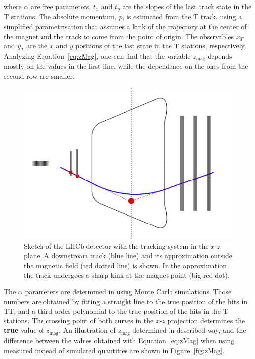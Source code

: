 where $\alpha$ are free parameters, $t_{x}$ and $t_{y}$ are the slopes of the last track state in the T stations. The absolute momentum, $p$, is estimated from the T track, using a simplified parametrisation that assumes a kink of the trajectory at the center of the magnet and the track to come from the point of origin. The observables $x_{T}$ and $y_{T}$ are the $x$ and $y$ positions of the last state in the T stations, respectively. Analyzing Equation~\ref{eq:zMag}, one can find that the variable $z_{\text{mag}}$ depends mostly on the values in the first line, while the dependence on the ones from the second row are smaller. 


\begin{figure}[!htbp]
 \begin{center}
    \includegraphics[width=0.49\linewidth]{figures/magnetPointDownstream2.png}
   \caption{Sketch of the LHCb detector with the tracking system in the $x$-$z$ plane. A downstream track (blue line) and its approximation outside the magnetic field (red dotted line) is shown. In the approximation the track undergoes a sharp kink at the magnet point (big red dot).
     \label{fig:magnetPointSketch}}
 \end{center}
\end{figure}

The $\alpha$ parameters are determined in using Monte Carlo simulations. Those numbers are obtained by fitting a straight line to the true position of the hits in TT, and a third-order polynomial to the true position of the hits in the T stations. The crossing point of both curves in the $x$-$z$ projection
determines the \textbf{true} value of $z_{\text{mag}}$. An illustration of $z_{\text{mag}}$ determined in described way, and
the difference between the values obtained with Equation~\ref{eq:zMag} when using measured 
instead of simulated quantities are shown in Figure~\ref{fig:zMag}.

